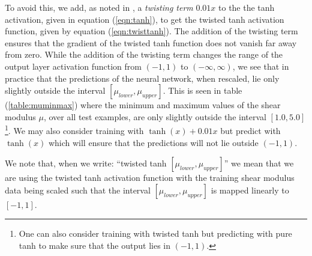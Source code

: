 \documentclass[12pt]{article}
\begin{document}
To avoid this, we add, as noted in \cite{bookchap:lecun98b}, a \textit{twisting term} $0.01x$ to the the tanh activation, given in equation (\ref{eqn:tanh}), to get the twisted tanh activation function, given by equation (\ref{eqn:twisttanh}). The addition of the twisting term ensures that the gradient of the twisted tanh function does not vanish far away from zero. While the addition of the twisting term changes the range of the output layer activation function from $(-1,1)$ to $(-\infty,\infty)$, we see that in practice that the predictions of the neural network, when rescaled, lie only slightly outside the interval $[\mu_{lower},\mu_{upper}]$. This is seen in table (\ref{table:muminmax}) where the minimum and maximum values of the shear modulus $\mu$, over all test examples, are only slightly outside the interval $[1.0,5.0]$\footnote{One can also consider training with twisted tanh but predicting with pure tanh to make sure that the output lies in $(-1,1)$.}. We may also consider training with $\tanh(x)+0.01x$ but predict with $\tanh(x)$ which will ensure that the predictions will not lie outside $(-1,1)$.

We note that, when we write: ``twisted tanh $[\mu_{lower},\mu_{upper}]$'' we mean that we are using the twisted tanh activation function with the training shear modulus data being scaled such that the interval $[\mu_{lower},\mu_{upper}]$ is mapped linearly to $[-1,1]$. %
\end{document}
